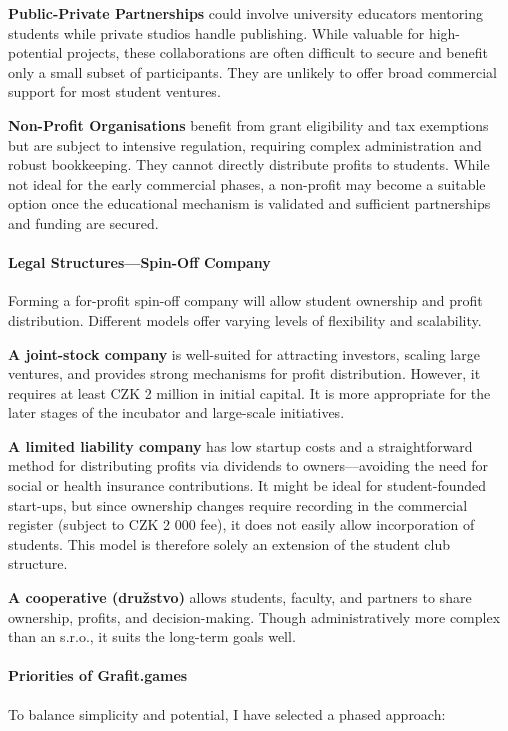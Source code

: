 \textbf{Public-Private Partnerships} could involve university educators mentoring students while private studios handle publishing. While valuable for high-potential projects, these collaborations are often difficult to secure and benefit only a small subset of participants. They are unlikely to offer broad commercial support for most student ventures.

\textbf{Non-Profit Organisations} benefit from grant eligibility and tax exemptions but are subject to intensive regulation, requiring complex administration and robust bookkeeping. They cannot directly distribute profits to students. While not ideal for the early commercial phases, a non-profit may become a suitable option once the educational mechanism is validated and sufficient partnerships and funding are secured.

\paragraph{Legal Structures—Spin-Off Company}
Forming a for-profit spin-off company will allow student ownership and profit distribution. Different models offer varying levels of flexibility and scalability.

\textbf{A joint-stock company} is well-suited for attracting investors, scaling large ventures, and provides strong mechanisms for profit distribution. However, it requires at least CZK 2 million in initial capital. It is more appropriate for the later stages of the incubator and large-scale initiatives.

\textbf{A limited liability company} has low startup costs and a straightforward method for distributing profits via dividends to owners—avoiding the need for social or health insurance contributions. It might be ideal for student-founded start-ups, but since ownership changes require recording in the commercial register (subject to CZK 2 000 fee), it does not easily allow incorporation of students. This model is therefore solely an extension of the student club structure.

\textbf{A cooperative (družstvo)} allows students, faculty, and partners to share ownership, profits, and decision-making. Though administratively more complex than an s.r.o., it suits the long-term goals well.

\paragraph{Priorities of Grafit.games}
To balance simplicity and potential, I have selected a phased approach:

